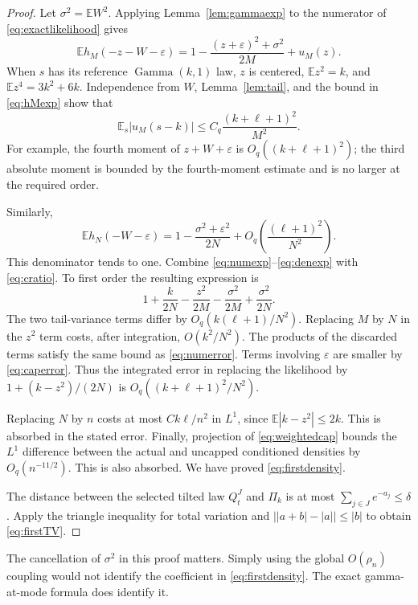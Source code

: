 \documentclass[11pt,letterpaper]{article}
\numberwithin{equation}{section}
\theoremstyle{definition}
\theoremstyle{remark}
\newcommand{\EE}{\mathbb E}
\newcommand{\eps}{\varepsilon}
\begin{document}
\begin{proof}
Let $\sigma^2=\EE W^2$. Applying Lemma~\ref{lem:gammaexp} to the numerator of
\eqref{eq:exactlikelihood} gives
\begin{equation}
 \EE h_M(-z-W-\eps)
 =1-\frac{(z+\eps)^2+\sigma^2}{2M}+u_M(z).
 \label{eq:numexp}
\end{equation}
When $s$ has its reference $\operatorname{Gamma}(k,1)$ law, $z$ is centered,
$\EE z^2=k$, and $\EE z^4=3k^2+6k$. Independence from $W$,
Lemma~\ref{lem:tail}, and the bound in \eqref{eq:hMexp} show that
\begin{equation}
 \EE_{s}|u_M(s-k)|
 \le C_q\frac{(k+\ell+1)^2}{M^2}.
 \label{eq:numerror}
\end{equation}
For example, the fourth moment of $z+W+\eps$ is
$O_q((k+\ell+1)^2)$; the third absolute moment is bounded by the fourth-moment
estimate and is no larger at the required order.

Similarly,
\begin{equation}
 \EE h_N(-W-\eps)
 =1-\frac{\sigma^2+\eps^2}{2N}
   +O_q\left(\frac{(\ell+1)^2}{N^2}\right).
 \label{eq:denexp}
\end{equation}
This denominator tends to one. Combine \eqref{eq:numexp}--\eqref{eq:denexp}
with \eqref{eq:cratio}. To first order the resulting expression is
\[
 1+\frac{k}{2N}-\frac{z^2}{2M}
   -\frac{\sigma^2}{2M}+\frac{\sigma^2}{2N}.
\]
The two tail-variance terms differ by
$O_q(k(\ell+1)/N^2)$. Replacing $M$ by $N$ in the $z^2$ term costs, after
integration, $O(k^2/N^2)$. The products of the discarded terms satisfy the
same bound as \eqref{eq:numerror}. Terms involving $\eps$ are smaller by
\eqref{eq:caperror}. Thus the integrated error in replacing the likelihood
by $1+(k-z^2)/(2N)$ is $O_q((k+\ell+1)^2/N^2)$.

Replacing $N$ by $n$ costs at most $Ck\ell/n^2$ in $L^1$, since
$\EE|k-z^2|\le2k$. This is absorbed in the stated error.
Finally, projection of \eqref{eq:weightedcap} bounds the $L^1$ difference
between the actual and uncapped conditioned densities by $O_q(n^{-11/2})$.
This is also absorbed. We have proved \eqref{eq:firstdensity}.

The distance between the selected tilted law $Q_t^J$ and $\Pi_k$ is at most
$\sum_{j\in J}e^{-a_j}\le\delta$. Apply the triangle inequality for total
variation and $\big||a+b|-|a|\big|\le|b|$ to obtain \eqref{eq:firstTV}.
\end{proof}

The cancellation of $\sigma^2$ in this proof matters. Simply using the global
$O(\rho_n)$ coupling would not identify the coefficient in
\eqref{eq:firstdensity}. The exact gamma-at-mode formula does identify it.
\end{document}
